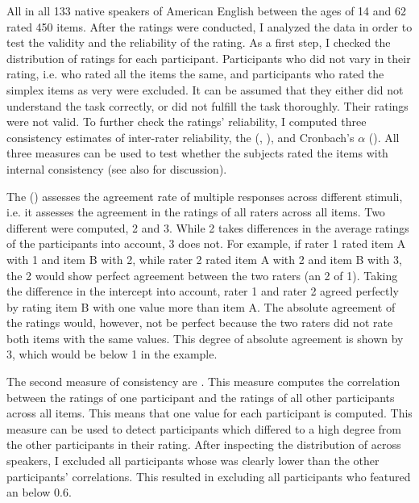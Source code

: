 All in all 133 native speakers of American English between the ages of 14 and 62 rated 450 items. 
After the ratings were conducted, I analyzed the data in order to test the validity and the reliability of the rating. As a first step, I checked the distribution of ratings for each participant. Participants who did not vary in their rating, i.e. who rated all the items the same, and participants who rated the simplex items as very  were excluded. It can be assumed that they either did not understand the task correctly, or did not fulfill the task thoroughly. Their ratings were not valid.
To further check the ratings' reliability, I computed three consistency estimates of inter-rater reliability, the  (, \citealt{Bartko.1966}),  and Cronbach's $\alpha$ (\citealt{Cronbach.1951}). All three measures can be used to test whether the subjects rated the items with internal consistency (see also \citealt[38 ff.]{Stemler.2008} for discussion). 

The  () assesses the agreement rate of multiple responses across different stimuli, i.e. it assesses the agreement in the ratings of all raters across all items. Two different  were computed,  2 and  3. While  2 takes differences in the average ratings of the participants into account,  3 does not. For example, if rater 1 rated item A with 1 and item B with 2, while rater 2 rated item A with 2 and item B with 3, the  2 would show perfect agreement between the two raters (an  2 of 1). Taking the difference in the intercept into account, rater 1 and rater 2 agreed perfectly by rating item B with one value more than item A. The absolute agreement of the ratings would, however, not be perfect because the two raters did not rate both items with the same values. This degree of absolute agreement is shown by  3, which would be below 1 in the example.

The second measure of consistency are . This measure computes the correlation between the ratings of one participant and the ratings of all other participants across all items. This means that one value for each participant is computed. This measure can be used to detect participants which differed to a high degree from the other participants in their rating. After inspecting the distribution of  across speakers, I excluded all participants whose  was clearly lower than the other participants' correlations. This resulted in excluding all participants who featured an  below 0.6. 

